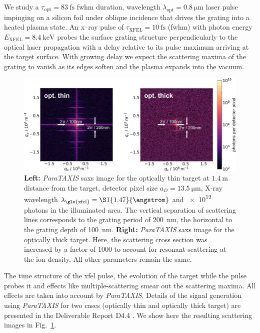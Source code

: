 We study a $\tau_\mathrm{opt} = \SI{83}{\fs}$ \gls{fwhm} duration, wavelength $\lambda_\mathrm{opt} =
\SI{0.8}{\micro\metre}$ laser pulse impinging on a silicon foil under oblique incidence
that drives the grating into a heated plasma state. An x--ray pulse of
$\tau_\mathrm{XFEL} = \SI{10}{\fs}$ (\gls{fwhm}) with photon energy
$E_\mathrm{XFEL} = \SI{8.4}{\kilo\electronvolt}$ probes the surface grating structure
perpendicularly to the optical laser propagation with a delay relative to its
pulse maximum arriving at the target surface. With growing delay we expect the
scattering maxima of the grating to vanish as its edges soften and the plasma
expands into the vacuum.
%
\begin{figure}[ht]
  \centering
  \includegraphics[width=.99\linewidth]{figures/scattering_images_v2.png}
  \caption{
    \textbf{Left:} \textit{ParaTAXIS} \gls{saxs} image for the optically thin target at
    $\SI{1.4}{\metre}$ distance from the target, detector pixel size $a_D =
    \SI{13.5}{\micro\metre}$, X-ray wavelength $\lambda_\mathrm{\gls{xfel}} =
    \SI{1.47}{\angstrom}$ and
    \num{e12} photons in the illuminated area. The vertical separation of scattering
    lines corresponds to the grating period of \SI{200}{\nano\metre}, the horizontal to
    the grating depth of \SI{100}{\nano\metre}.
    \textbf{Right:} \textit{ParaTAXIS} \gls{saxs} image for the optically thick target. Here, the
    scattering cross section was increased by a factor of \num{1000} to account for
  resonant scattering at the ion density. All other parameters remain the same.  }
  \label{fig:scattering}
\end{figure}
%
The time structure of the \gls{xfel} pulse, the evolution of the target while the
pulse probes it and effects like multiple-scattering smear out the scattering
maxima. All effects are taken into account by \textit{ParaTAXIS}.
Details of the signal generation using \textit{ParaTAXIS} for two cases (optically thin and optically
thick target) are presented in the Deliverable Report D4.4
\cite{EUCALL_SIMEX_D4.4}. We show here the resulting scattering images in
Fig.~\ref{fig:scattering}.

\FloatBarrier

